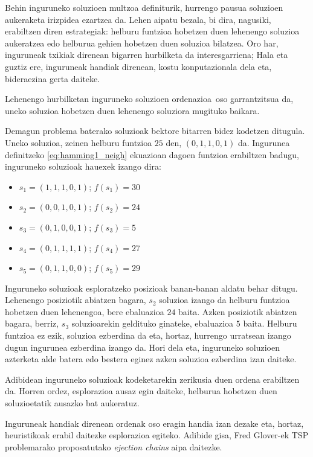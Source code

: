 \documentclass[eu]{ifirak}\usepackage[]{graphicx}\usepackage[]{color}
\newcommand{\zkk}{\guillemotleft}
\newcommand{\skk}{\guillemotright}
\begin{document}
Behin inguruneko soluzioen multzoa definiturik, hurrengo pausua soluzioen aukeraketa irizpidea ezartzea da. Lehen aipatu bezala, bi dira, nagusiki, erabiltzen diren estrategiak: helburu funtzioa hobetzen duen lehenengo soluzioa aukeratzea edo helburua gehien hobetzen duen soluzioa bilatzea. Oro har, inguruneak txikiak direnean bigarren hurbilketa da interesgarriena; Hala eta guztiz ere, inguruneak handiak direnean, kostu konputazionala dela eta, bideraezina gerta daiteke.

Lehenengo hurbilketan inguruneko soluzioen \zkk ordenazioa\skk\ oso garrantzitsua da, uneko soluzioa hobetzen duen lehenengo soluziora mugituko baikara. 

\begin{tcolorbox}
\begin{ifexample}
Demagun problema baterako soluzioak bektore bitarren bidez kodetzen ditugula. Uneko soluzioa, zeinen helburu funtzioa $25$ den, $(0,1,1,0,1)$ da. Ingurunea definitzeko \eqref{eq:hamming1_neigh} ekuazioan dagoen funtzioa erabiltzen badugu, inguruneko soluzioak hauexek izango dira:
\begin{itemize}
\item $s_1=(1,1,1,0,1)$; $f(s_1)=30$
\item $s_2=(0,0,1,0,1)$; $f(s_2)=24$
\item $s_3=(0,1,0,0,1)$; $f(s_3)=5$
\item $s_4=(0,1,1,1,1)$; $f(s_4)=27$
\item $s_5=(0,1,1,0,0)$; $f(s_5)=29$
\end{itemize} 
Inguruneko soluzioak esploratzeko posizioak banan-banan aldatu behar ditugu. Lehenengo posiziotik abiatzen bagara, $s_2$ soluzioa izango da helburu funtzioa hobetzen duen lehenengoa, bere ebaluazioa $24$ baita. Azken posiziotik abiatzen bagara, berriz, $s_3$ soluzioarekin geldituko ginateke, ebaluazioa $5$ baita. Helburu funtzioa ez ezik, soluzioa ezberdina da eta, hortaz, hurrengo urratsean izango dugun ingurunea ezberdina izango da. Hori dela eta, inguruneko soluzioen azterketa alde batera edo bestera eginez azken soluzioa ezberdina izan daiteke.
\end{ifexample}
\end{tcolorbox}

Adibidean inguruneko soluzioak kodeketarekin zerikusia duen ordena erabiltzen da. Horren ordez, esplorazioa ausaz egin daiteke, helburua hobetzen duen soluzioetatik ausazko bat aukeratuz.

Inguruneak handiak direnean ordenak oso eragin handia izan dezake eta, hortaz, heuristikoak erabil daitezke esplorazioa egiteko. Adibide gisa, Fred Glover-ek TSP problemarako proposatutako \textit{ejection chains} \citep{pesch1997} aipa daitezke. 
\end{document}
